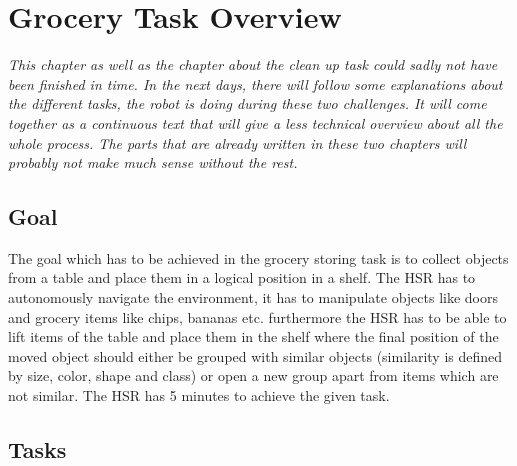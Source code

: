 \documentclass[main.tex]{subfiles}
\begin{document}
	
	\begingroup
	
	\renewcommand{\cleardoublepage}{}
	
	\renewcommand{\clearpage}{}
	
	\chapter{Grocery Task Overview}
	

\textit{This chapter as well as the chapter about the clean up task could sadly not have been finished in time. In the next days, there will follow some explanations about the different tasks, the robot is doing during these two challenges. It will come together as a continuous text that will give a less technical overview about all the whole process. The parts that are already written in these two chapters will probably not make much sense without the rest.}

	\section{Goal}

	The goal which has to be achieved in the grocery storing task is to collect objects from a table and place them in a logical position in a shelf. The HSR has to autonomously navigate the environment, it has to manipulate objects like doors and grocery items like chips, bananas etc. furthermore the HSR has to be able to lift items of the table and place them in the shelf where the final position of the moved object should either be grouped with similar objects (similarity is defined by size, color, shape and class) or open a new group apart from items which are not similar. The HSR has 5 minutes to achieve the given task.
	

	\section{Tasks}
\end{document}
